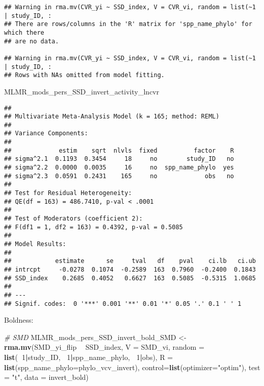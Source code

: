 \documentclass[]{article}
\newenvironment{Shaded}{\begin{snugshade}}{\end{snugshade}}
\newcommand{\KeywordTok}[1]{\textcolor[rgb]{0.13,0.29,0.53}{\textbf{#1}}}
\newcommand{\DataTypeTok}[1]{\textcolor[rgb]{0.13,0.29,0.53}{#1}}
\newcommand{\DecValTok}[1]{\textcolor[rgb]{0.00,0.00,0.81}{#1}}
\newcommand{\StringTok}[1]{\textcolor[rgb]{0.31,0.60,0.02}{#1}}
\newcommand{\CommentTok}[1]{\textcolor[rgb]{0.56,0.35,0.01}{\textit{#1}}}
\newcommand{\OperatorTok}[1]{\textcolor[rgb]{0.81,0.36,0.00}{\textbf{#1}}}
\newcommand{\NormalTok}[1]{#1}
\begin{document}
\begin{verbatim}
## Warning in rma.mv(CVR_yi ~ SSD_index, V = CVR_vi, random = list(~1 | study_ID, :
## There are rows/columns in the 'R' matrix for 'spp_name_phylo' for which there
## are no data.

## Warning in rma.mv(CVR_yi ~ SSD_index, V = CVR_vi, random = list(~1 | study_ID, :
## Rows with NAs omitted from model fitting.
\end{verbatim}

\begin{Shaded}
\begin{Highlighting}[]
\NormalTok{      MLMR_mods_pers_SSD_invert_activity_lncvr}
\end{Highlighting}
\end{Shaded}

\begin{verbatim}
## 
## Multivariate Meta-Analysis Model (k = 165; method: REML)
## 
## Variance Components:
## 
##             estim    sqrt  nlvls  fixed          factor    R 
## sigma^2.1  0.1193  0.3454     18     no        study_ID   no 
## sigma^2.2  0.0000  0.0035     16     no  spp_name_phylo  yes 
## sigma^2.3  0.0591  0.2431    165     no             obs   no 
## 
## Test for Residual Heterogeneity:
## QE(df = 163) = 486.7410, p-val < .0001
## 
## Test of Moderators (coefficient 2):
## F(df1 = 1, df2 = 163) = 0.4392, p-val = 0.5085
## 
## Model Results:
## 
##            estimate      se     tval   df    pval    ci.lb   ci.ub 
## intrcpt     -0.0278  0.1074  -0.2589  163  0.7960  -0.2400  0.1843    
## SSD_index    0.2685  0.4052   0.6627  163  0.5085  -0.5315  1.0685    
## 
## ---
## Signif. codes:  0 '***' 0.001 '**' 0.01 '*' 0.05 '.' 0.1 ' ' 1
\end{verbatim}

Boldness:

\begin{Shaded}
\begin{Highlighting}[]
   \CommentTok{# SMD}
\NormalTok{      MLMR_mods_pers_SSD_invert_bold_SMD <-}\StringTok{ }\KeywordTok{rma.mv}\NormalTok{(SMD_yi_flip }\OperatorTok{~}\StringTok{ }\NormalTok{SSD_index, }\DataTypeTok{V =}\NormalTok{ SMD_vi, }
                                          \DataTypeTok{random =} \KeywordTok{list}\NormalTok{(}\OperatorTok{~}\DecValTok{1}\OperatorTok{|}\NormalTok{study_ID, }\OperatorTok{~}\DecValTok{1}\OperatorTok{|}\NormalTok{spp_name_phylo, }\OperatorTok{~}\DecValTok{1}\OperatorTok{|}\NormalTok{obs), }
                                          \DataTypeTok{R =} \KeywordTok{list}\NormalTok{(}\DataTypeTok{spp_name_phylo=}\NormalTok{phylo_vcv_invert), }\DataTypeTok{control=}\KeywordTok{list}\NormalTok{(}\DataTypeTok{optimizer=}\StringTok{"optim"}\NormalTok{), }
                                          \DataTypeTok{test =} \StringTok{"t"}\NormalTok{, }\DataTypeTok{data =}\NormalTok{ invert_bold)}
\end{Highlighting}
\end{Shaded}
\end{document}
